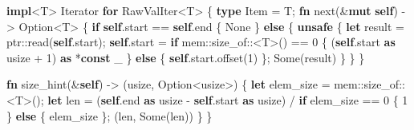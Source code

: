 \documentclass[a4paper,]{book}
\newenvironment{Shaded}{\begin{snugshade}}{\end{snugshade}}
\newcommand{\KeywordTok}[1]{\textcolor[rgb]{0.13,0.29,0.53}{\textbf{{#1}}}}
\newcommand{\DataTypeTok}[1]{\textcolor[rgb]{0.13,0.29,0.53}{{#1}}}
\newcommand{\DecValTok}[1]{\textcolor[rgb]{0.00,0.00,0.81}{{#1}}}
\newcommand{\ConstantTok}[1]{\textcolor[rgb]{0.00,0.00,0.00}{{#1}}}
\newcommand{\BuiltInTok}[1]{{#1}}
\newcommand{\NormalTok}[1]{{#1}}
\begin{document}
\begin{Shaded}
\begin{Highlighting}[]
\KeywordTok{impl}\NormalTok{<T> }\BuiltInTok{Iterator} \KeywordTok{for} \NormalTok{RawValIter<T> \{}
    \KeywordTok{type} \NormalTok{Item = T;}
    \KeywordTok{fn} \NormalTok{next(&}\KeywordTok{mut} \KeywordTok{self}\NormalTok{) -> }\DataTypeTok{Option}\NormalTok{<T> \{}
        \KeywordTok{if} \KeywordTok{self}\NormalTok{.start == }\KeywordTok{self}\NormalTok{.end \{}
            \ConstantTok{None}
        \NormalTok{\} }\KeywordTok{else} \NormalTok{\{}
            \KeywordTok{unsafe} \NormalTok{\{}
                \KeywordTok{let} \NormalTok{result = ptr::read(}\KeywordTok{self}\NormalTok{.start);}
                \KeywordTok{self}\NormalTok{.start = }\KeywordTok{if} \NormalTok{mem::size_of::<T>() == }\DecValTok{0} \NormalTok{\{}
                    \NormalTok{(}\KeywordTok{self}\NormalTok{.start }\KeywordTok{as} \DataTypeTok{usize} \NormalTok{+ }\DecValTok{1}\NormalTok{) }\KeywordTok{as} \NormalTok{*}\KeywordTok{const} \NormalTok{_}
                \NormalTok{\} }\KeywordTok{else} \NormalTok{\{}
                    \KeywordTok{self}\NormalTok{.start.offset(}\DecValTok{1}\NormalTok{)}
                \NormalTok{\};}
                \ConstantTok{Some}\NormalTok{(result)}
            \NormalTok{\}}
        \NormalTok{\}}
    \NormalTok{\}}

    \KeywordTok{fn} \NormalTok{size_hint(&}\KeywordTok{self}\NormalTok{) -> (}\DataTypeTok{usize}\NormalTok{, }\DataTypeTok{Option}\NormalTok{<}\DataTypeTok{usize}\NormalTok{>) \{}
        \KeywordTok{let} \NormalTok{elem_size = mem::size_of::<T>();}
        \KeywordTok{let} \NormalTok{len = (}\KeywordTok{self}\NormalTok{.end }\KeywordTok{as} \DataTypeTok{usize} \NormalTok{- }\KeywordTok{self}\NormalTok{.start }\KeywordTok{as} \DataTypeTok{usize}\NormalTok{)}
                  \NormalTok{/ }\KeywordTok{if} \NormalTok{elem_size == }\DecValTok{0} \NormalTok{\{ }\DecValTok{1} \NormalTok{\} }\KeywordTok{else} \NormalTok{\{ elem_size \};}
        \NormalTok{(len, }\ConstantTok{Some}\NormalTok{(len))}
    \NormalTok{\}}
\NormalTok{\}}


\end{Highlighting}
\end{Shaded}
\end{document}
